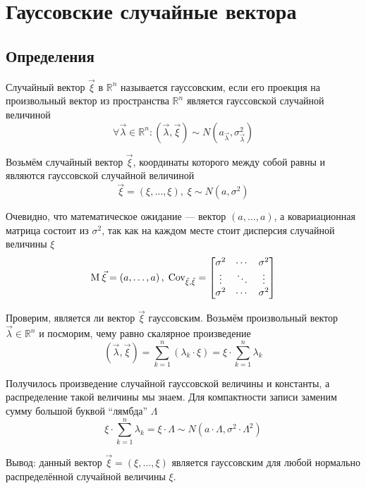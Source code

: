\section{Гауссовские случайные вектора}

\subsection{Определения}
\begin{definition}
    \label{def:gaussianVector}
    Случайный вектор $\vec{\xi}$ в $\mathbb{R}^n$ называется гауссовским, если
    его проекция на произвольный вектор из пространства $\mathbb{R}^n$
    является гауссовской случайной величиной
    $$\forall \vec{\lambda} \in \mathbb{R}^n:
        \left( \vec{\lambda}, \vec{\xi} \right)
            \sim N\left( a_{\vec{\lambda}}, \sigma_{\vec{\lambda}}^2 \right)$$
\end{definition}

\begin{example}\label{ex:gaussVectorsIntro}
    Возьмём случайный вектор $\vec{\xi}$, координаты которого между собой равны
    и являются гауссовской случайной величиной
    $$\vec{\xi} = \left( \xi, \dots, \xi \right),\;
        \xi \sim N\left( a, \sigma^2 \right)$$

    Очевидно, что математическое ожидание --- вектор
    $\left( a, \dots, a \right)$, а ковариационная матрица состоит из
    $\sigma^2$, так как на каждом месте стоит дисперсия случайной величины $\xi$
    $$\operatorname{M}_{} \vec{\xi} = \left( a, \dots, a \right),\;
        \operatorname{Cov^{}_{\vec{\xi}, \vec{\xi}}} =
        \begin{bmatrix}
            \sigma^2 & \cdots & \sigma^2 \\
            \vdots & \ddots & \vdots \\
            \sigma^2 & \cdots & \sigma^2
        \end{bmatrix}$$

    Проверим, является ли вектор $\vec{\xi}$ гауссовским.
    Возьмём произвольный вектор $\vec{\lambda} \in \mathbb{R}^n$
    и посморим, чему равно скалярное произведение
    $$\left( \vec{\lambda}, \vec{\xi} \right)
        = \sum_{k=1}^{n} \left( \lambda_k \cdot \xi \right)
        = \xi \cdot \sum_{k=1}^{n} \lambda_k$$

    Получилось произведение случайной гауссовской величины и константы,
    а распределение такой величины мы знаем. Для компактности записи
    заменим сумму большой буквой ``лямбда'' $\Lambda$
    $$\xi \cdot \sum_{k=1}^{n} \lambda_k
        = \xi \cdot \Lambda \sim N\left( a \cdot \Lambda,
            \sigma^2 \cdot \Lambda^2 \right)$$

    Вывод: данный вектор $\vec{\xi}=\left( \xi, \dots, \xi \right)$ является
    гауссовским для любой нормально распределённой случайной величины $\xi$.
\end{example}

